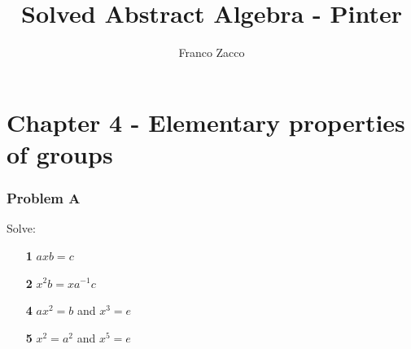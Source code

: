 \documentclass[11pt]{article}
\title{\textbf{Solved Abstract Algebra - Pinter}}
\author{Franco Zacco}
\date{}
\begin{document}
\maketitle
\thispagestyle{empty}

\section*{Chapter 4 - Elementary properties of groups}

	\subsubsection*{Problem A}
	Solve:
	\begin{itemize}
		\item [\textbf{1}] $axb = c$
		\item [\textbf{2}] $x^2b = xa^{-1}c$
		\item [\textbf{4}] $ax^2=b$ and $x^3=e$
		\item [\textbf{5}] $x^2=a^2$ and $x^5=e$
	\end{itemize}
\end{document}
